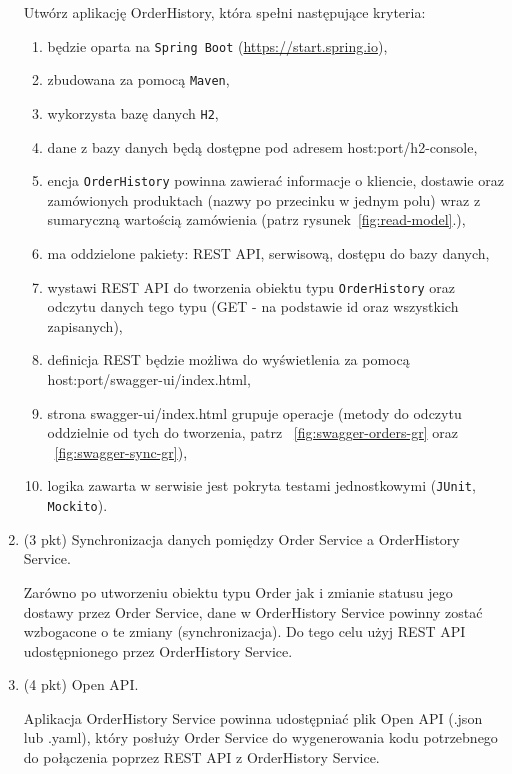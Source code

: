 \documentclass[12pt]{article}
\begin{document}
\begin{enumerate}
            Utwórz aplikację OrderHistory, która spełni następujące kryteria:
            \begin{enumerate}
                \item będzie oparta na \texttt{Spring Boot} (\url{https://start.spring.io}),
                \item zbudowana za pomocą \texttt{Maven},
                \item wykorzysta bazę danych \texttt{H2},
                \item dane z bazy danych będą dostępne pod adresem host:port/h2-console,
                \item encja \texttt{OrderHistory} powinna zawierać informacje o kliencie, dostawie oraz zamówionych produktach (nazwy po przecinku w jednym polu) wraz z sumaryczną wartością zamówienia (patrz rysunek~\ref{fig:read-model}.),
                \item ma oddzielone pakiety: REST API, serwisową, dostępu do bazy danych,
                \item wystawi REST API do tworzenia obiektu typu \texttt{OrderHistory} oraz odczytu danych tego typu (GET - na podstawie id oraz wszystkich zapisanych),
                \item definicja REST będzie możliwa do wyświetlenia za pomocą host:port/swagger-ui/index.html,
                \item strona swagger-ui/index.html grupuje operacje (metody do odczytu oddzielnie od tych do tworzenia, patrz ~\ref{fig:swagger-orders-gr} oraz ~\ref{fig:swagger-sync-gr}),
                \item logika zawarta w serwisie jest pokryta testami jednostkowymi (\texttt{JUnit}, \texttt{Mockito}).
            \end{enumerate}

        \item\label{exc:cqrs_sync}
            (3 pkt) Synchronizacja danych pomiędzy Order Service a OrderHistory Service.

            Zarówno po utworzeniu obiektu typu Order jak i zmianie statusu jego dostawy przez Order Service, dane w OrderHistory Service powinny zostać wzbogacone o te zmiany (synchronizacja).
            Do tego celu użyj REST API udostępnionego przez OrderHistory Service.
        \item\label{exc:openapi}
            (4 pkt) Open API.

            Aplikacja OrderHistory Service powinna udostępniać plik Open API (.json lub .yaml), który posłuży Order Service do wygenerowania kodu potrzebnego do połączenia poprzez REST API z OrderHistory Service.


\end{enumerate}
\end{document}
